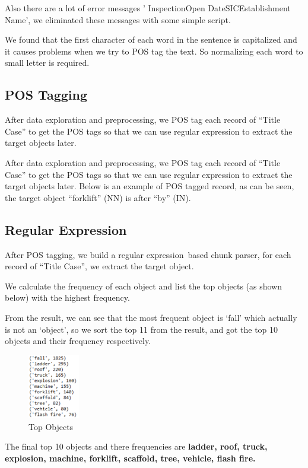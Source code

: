 \documentclass[DIV=calc, paper=a4, fontsize=11pt, twocolumn]{scrartcl}	 %
\begin{document}
Also there are a lot of error messages ' InspectionOpen
DateSICEstablishment Name', we eliminated these messages with some
simple script.

We found that the first character of each word in the sentence is
capitalized and it causes problems when we try to POS tag the text. So
normalizing each word to small letter is required.


\subsection{POS Tagging}
After data exploration and preprocessing, we POS tag each record of
“Title Case” to get the POS tags so that we can use regular expression
to extract the target objects later.

After data exploration and preprocessing, we POS tag each record of
“Title Case” to get the POS tags so that we can use regular expression
to extract the target objects later. Below is an example of POS tagged
record, as can be seen, the target object “forklift” (NN) is after
“by” (IN).


\subsection{Regular Expression}
After POS tagging, we build a regular expression based chunk parser,
for each record of “Title Case”, we extract the target object.

We calculate the frequency of each object and list the top objects
(as shown below) with the highest frequency.

From the result, we can see that the most frequent object is ‘fall’
which actually is not an ‘object’, so we sort the top 11 from the
result, and got the top 10 objects and their frequency respectively.


\begin{figure}[h!]
  \centering
      \includegraphics[width=0.2\textwidth]{obj11.png}
   \caption{Top Objects}
\end{figure}

The final top 10 objects and there frequencies are {\bf ladder, roof,
  truck, explosion, machine, forklift, scaffold, tree, vehicle, flash fire.
}
\end{document}
